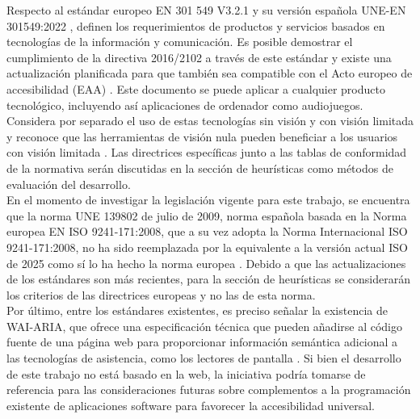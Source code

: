  Respecto al estándar europeo EN 301 549 V3.2.1 \cite{EN301549-2021} y su versión española UNE-EN 301549:2022 \cite{UNEEN3015492022}, definen los requerimientos de productos y servicios basados en tecnologías de la información y comunicación. Es posible demostrar el cumplimiento de la directiva 2016/2102 \cite{DirectiveEU20162016} a través de este estándar \cite[p ~89]{EN301549-2021} y existe una actualización planificada para que también sea compatible con el Acto europeo de accesibilidad (EAA) \cite{DirectiveEU20192019}. Este documento se puede aplicar a cualquier producto tecnológico, incluyendo así aplicaciones de ordenador como audiojuegos. Considera por separado el uso de estas tecnologías sin visión y con visión limitada y reconoce que las herramientas de visión nula pueden beneficiar a los usuarios con visión limitada \cite[p ~ 20]{EN301549-2021}. Las directrices específicas junto a las tablas de conformidad de la normativa serán discutidas en la sección de heurísticas como métodos de evaluación del desarrollo. \\
 
 En el momento de investigar la legislación vigente para este trabajo, se encuentra que la norma UNE 139802 de julio de 2009, norma española basada en la Norma europea EN ISO 9241-171:2008, que a su vez adopta la Norma Internacional ISO 9241-171:2008, no ha sido reemplazada por la equivalente a la versión actual ISO de 2025 como sí lo ha hecho la norma europea \cite{UNE139802-2009}. Debido a que las actualizaciones de los estándares son más recientes, para la sección de heurísticas se considerarán los criterios de las directrices europeas y no las de esta norma. \\ 
 
 Por último, entre los estándares existentes, es preciso señalar la existencia de WAI-ARIA, que ofrece una especificación técnica que pueden añadirse al código fuente de una página web para proporcionar información semántica adicional a las tecnologías de asistencia, como los lectores de pantalla \cite{AccessibleRichInternet}. Si bien el desarrollo de este trabajo no está basado en la web, la iniciativa podría tomarse de referencia para las consideraciones futuras sobre complementos a la programación existente de aplicaciones software para favorecer la accesibilidad universal.\\

